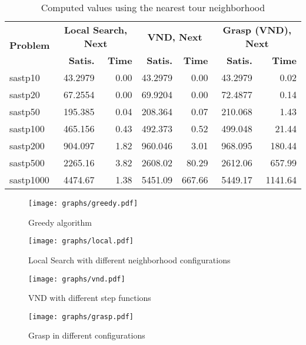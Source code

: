 \documentclass{article}
\begin{document}

\begin{table}[b!]
  \vspace{-6mm}%
  \caption{Computed values using the nearest tour neighborhood}
  \label{tab:NearestTour}
  \setlength{\tabcolsep}{1.4mm}
  \centering
  \begin{tabular}{lrrrrrr}
   \multirow{2}{*}{\bfseries Problem} &
      \multicolumn{2}{c}{\bfseries Local Search, Next} &
      \multicolumn{2}{c}{\bfseries VND, Next} &
      \multicolumn{2}{c}{\bfseries Grasp (VND), Next} \\
    &
    \bfseries Satis. &
    \bfseries Time &
    \bfseries Satis. &
    \bfseries Time &
    \bfseries Satis. &
    \bfseries Time 
    \\\hline
sastp10   & 43.2979 & 0.00 & 43.2979 & 0.00 & 43.2979 & 0.02 \\
sastp20   & 67.2554 & 0.00 & 69.9204 & 0.00 & 72.4877 & 0.14 \\
sastp50   & 195.385 & 0.04 & 208.364 & 0.07 & 210.068 & 1.43 \\
sastp100  & 465.156 & 0.43 & 492.373 & 0.52 & 499.048 & 21.44 \\
sastp200  & 904.097 & 1.82 & 960.046 & 3.01 & 968.095 & 180.44 \\
sastp500  & 2265.16 & 3.82 & 2608.02 & 80.29 & 2612.06 & 657.99 \\
sastp1000 & 4474.67 & 1.38 & 5451.09 & 667.66 & 5449.17 & 1141.64 
    \\\hline
  \end{tabular}

\end{table}



\begin{figure}[htb]
\centering
\texttt{[image: graphs/greedy.pdf]}
\caption{Greedy algorithm}
\label{fig:greedy}
\end{figure}

\begin{figure}[htb]
\centering
\texttt{[image: graphs/local.pdf]}
\caption{Local Search with different neighborhood configurations}
\label{fig:localSearch}
\end{figure}

\begin{figure}[htb]
\centering
\texttt{[image: graphs/vnd.pdf]}
\caption{VND with different step functions}
\label{fig:vnd}
\end{figure}

\begin{figure}[htb]
\centering
\texttt{[image: graphs/grasp.pdf]}
\caption{Grasp in different configurations}
\label{fig:grasp}
\end{figure}


\end{document}
